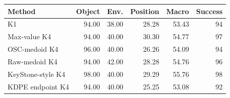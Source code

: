 \begin{tabular}{lrrrrr}
\toprule
Method & Object & Env. & Position & Macro & Success \\
\midrule
K1 & 94.00 & 38.00 & 28.28 & 53.43 & 94 \\
Max-value K4 & 94.00 & 40.00 & 30.30 & 54.77 & 97 \\
OSC-medoid K4 & 96.00 & 40.00 & 26.26 & 54.09 & 94 \\
Raw-medoid K4 & 94.00 & 42.00 & 28.28 & 54.76 & 96 \\
KeyStone-style K4 & 98.00 & 40.00 & 29.29 & 55.76 & 98 \\
KDPE endpoint K4 & 94.00 & 40.00 & 25.25 & 53.08 & 92 \\
\bottomrule
\end{tabular}
